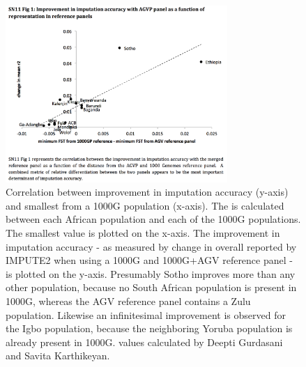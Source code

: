 \begin{figure}
\centering
\includegraphics[trim={0 3.5cm 0cm 1.25cm},clip,width=0.75\textwidth]{fig/SN11f1}
\caption[
Improvement in imputation accuracy for each population using two different reference panels as a function of difference in minimum  between each population in either of the two reference panels.]{
Correlation between improvement in imputation accuracy (y-axis) and smallest  from a \gls{1000G} population (x-axis). The  is calculated between each African population and each of the \gls{1000G} populations. The smallest value is plotted on the x-axis. The improvement in imputation accuracy - as measured by change in overall  reported by IMPUTE2 when using a \gls{1000G} and \gls{1000G}+\gls{AGV} reference panel - is plotted on the y-axis. Presumably Sotho improves more than any other population, because no South African population is present in \gls{1000G}, whereas the \gls{AGV} reference panel contains a Zulu population. Likewise an infinitesimal improvement is observed for the Igbo population, because the neighboring Yoruba population is already present in \gls{1000G}.  values calculated by Deepti Gurdasani and Savita Karthikeyan.
}
\label{fig:SN11f1}
\end{figure}
